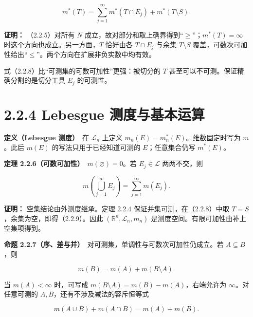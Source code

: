 \documentclass[11pt,a4paper]{article}
\begin{document}
\begin{equation*}
m^*(T)=\sum_{j=1}^{\infty}m^*(T\cap E_j)+m^*(T\setminus S).
\tag{2.2.8}
\end{equation*}

\textbf{证明：} （2.2.5）对所有 \(N\)
成立，故对部分和取上确界得到``\(\ge\)''；\(m^*(T)=\infty\)
时这个方向也成立。另一方面，\(T\) 恰好由各 \(T\cap E_j\) 与余集
\(T\setminus S\)
覆盖，可数次可加性给出``\(\le\)''。两个方向在扩展非负实数中均有效。

式（2.2.8）比``可测集的可数可加性''更强：被切分的 \(T\)
甚至可以不可测。保证精确分割的是切分工具 \(E_j\) 的可测性。

\section[\S{}2.2.4 Lebesgue
测度与基本运算]{2.2.4 Lebesgue
测度与基本运算}\label{lebesgue-ux6d4bux5ea6ux4e0eux57faux672cux8fd0ux7b97}

\textbf{定义（Lebesgue 测度）}　在 \(\mathcal L_n\) 上定义
\(m_n(E)=m_n^*(E)\)。维数固定时写为 \(m\)。此后 \(m(E)\)
的写法只用于已经知道可测的 \(E\)；任意集合仍写 \(m^*(E)\)。

\textbf{定理 2.2.6（可数可加性）}　\(m(\varnothing)=0\)。若
\(E_j\in\mathcal L\) 两两不交，则

\begin{equation*}
m\left(\bigcup_{j=1}^{\infty}E_j\right)=\sum_{j=1}^{\infty}m(E_j).
\tag{2.2.9}
\end{equation*}

\textbf{证明：} 空集结论由外测度继承。定理 2.2.4
保证并集可测，在（2.2.8）中取 \(T=S\)，余集为空，即得（2.2.9）。因此
\((\mathbb R^n,\mathcal L_n,m_n)\)
是测度空间。有限可加性由补上空集项得到。

\textbf{命题
2.2.7（序、差与并）}　对可测集，单调性与可数次可加性仍成立。若
\(A\subseteq B\)，则

\begin{equation*}
m(B)=m(A)+m(B\setminus A).
\tag{2.2.10}
\end{equation*}

当 \(m(A)<\infty\) 时，可写成 \(m(B\setminus A)=m(B)-m(A)\)，右端允许为
\(\infty\)。对任意可测的 \(A,B\)，还有不涉及减法的容斥恒等式

\begin{equation*}
m(A\cup B)+m(A\cap B)=m(A)+m(B).
\tag{2.2.11}
\end{equation*}
\end{document}
